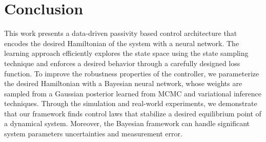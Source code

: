 \section{Conclusion}
\label{sec:bl_conclusion}

This work presents a data-driven passivity based control architecture that encodes
the desired Hamiltonian of the system with a neural network. 
%
The learning approach efficiently explores the state space using the state
sampling technique and enforces a desired behavior through a carefully
designed loss function.
%
To improve the robustness properties of the controller, we parameterize the
desired Hamiltonian with a Bayesian neural network, whose weights are sampled
from a Gaussian posterior learned from MCMC and variational inference
techniques.
%
Through the simulation and real-world experiments, we demonstrate that our
framework finds control laws that stabilize a desired equilibrium point of a
dynamical system. 
%
Moreover, the Bayesian framework can handle significant system
parameters uncertainties and measurement error.

